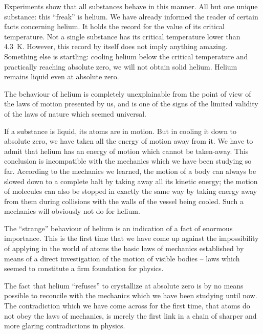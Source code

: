 Experiments show that all substances behave in this manner. All but one unique substance: this ``freak'' is helium. We have already informed the reader of certain facts concerning helium. It holds the record for the value of its critical temperature. Not a single substance has its crit­ical temperature lower than \SI{4.3}{\kelvin}. However, this record by itself does not imply anything amazing. Something else is startling: cooling helium below the critical tem­perature and practically reaching absolute zero, we will not obtain solid helium. Helium remains liquid even at absolute zero.

The behaviour of helium is completely unexplainable from the point of view of the laws of motion presented by us, and is one of the signs of the limited validity of the laws of nature which seemed universal.

If a substance is liquid, its atoms are in motion. But in cooling it down to absolute zero, we have taken all the energy of motion away from it. We have to admit that helium has an energy of motion which cannot be taken-away. This conclusion is incompatible with the mechan­ics which we have been studying so far. According to the mechanics we learned, the motion of a body can always be slowed down to a complete halt by taking away all its kinetic energy; the motion of molecules can also be stopped in exactly the same way by taking energy away from them during collisions with the walls of the vessel being cooled. Such a mechanics will obviously not do for helium.

The ``strange'' behaviour of helium is an indication of a fact of enormous importance. This is the first time that we have come up against the impossibility of applying in the world of atoms the basic laws of mechanics established by means of a direct investigation of the motion of visible bodies -- laws which seemed to constitute a firm founda­tion for physics.

The fact that helium ``refuses'' to crystallize at absolute zero is by no means possible to reconcile with the mechan­ics which we have been studying until now. The contradiction which we have come across for the first time, that atoms do not obey the laws of mechanics, is merely the first link in a chain of sharper and more glaring con­tradictions in physics.

